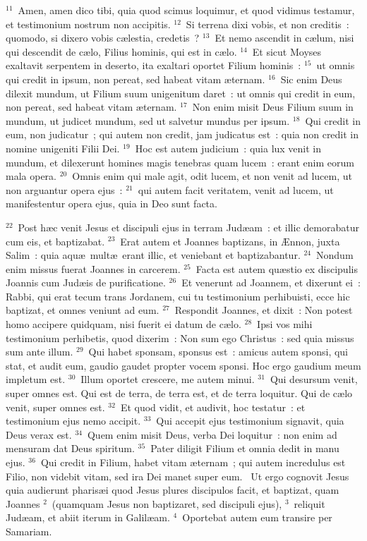 ${}^{11}$~Amen, amen dico tibi, quia quod scimus loquimur, et quod vidimus testamur, et testimonium nostrum non accipitis.
${}^{12}$~Si terrena dixi vobis, et non creditis~: quomodo, si dixero vobis c\ae lestia, credetis~?
${}^{13}$~Et nemo ascendit in c\ae lum, nisi qui descendit de c\ae lo, Filius hominis, qui est in c\ae lo.
${}^{14}$~Et sicut Moyses exaltavit serpentem in deserto, ita exaltari oportet Filium hominis~:
${}^{15}$~ut omnis qui credit in ipsum, non pereat, sed habeat vitam \ae ternam.
${}^{16}$~Sic enim Deus dilexit mundum, ut Filium suum unigenitum daret~: ut omnis qui credit in eum, non pereat, sed habeat vitam \ae ternam.
${}^{17}$~Non enim misit Deus Filium suum in mundum, ut judicet mundum, sed ut salvetur mundus per ipsum.
${}^{18}$~Qui credit in eum, non judicatur~; qui autem non credit, jam judicatus est~: quia non credit in nomine unigeniti Filii Dei.
${}^{19}$~Hoc est autem judicium~: quia lux venit in mundum, et dilexerunt homines magis tenebras quam lucem~: erant enim eorum mala opera.
${}^{20}$~Omnis enim qui male agit, odit lucem, et non venit ad lucem, ut non arguantur opera ejus~:
${}^{21}$~qui autem facit veritatem, venit ad lucem, ut manifestentur opera ejus, quia in Deo sunt facta.


${}^{22}$~Post h\ae c venit Jesus et discipuli ejus in terram Jud\ae am~: et illic demorabatur cum eis, et baptizabat.
${}^{23}$~Erat autem et Joannes baptizans, in \AE nnon, juxta Salim~: quia aqu\ae\ mult\ae\ erant illic, et veniebant et baptizabantur.
${}^{24}$~Nondum enim missus fuerat Joannes in carcerem.
${}^{25}$~Facta est autem qu\ae stio ex discipulis Joannis cum Jud\ae is de purificatione.
${}^{26}$~Et venerunt ad Joannem, et dixerunt ei~: Rabbi, qui erat tecum trans Jordanem, cui tu testimonium perhibuisti, ecce hic baptizat, et omnes veniunt ad eum.
${}^{27}$~Respondit Joannes, et dixit~: Non potest homo accipere quidquam, nisi fuerit ei datum de c\ae lo.
${}^{28}$~Ipsi vos mihi testimonium perhibetis, quod dixerim~: Non sum ego Christus~: sed quia missus sum ante illum.
${}^{29}$~Qui habet sponsam, sponsus est~: amicus autem sponsi, qui stat, et audit eum, gaudio gaudet propter vocem sponsi. Hoc ergo gaudium meum impletum est.
${}^{30}$~Illum oportet crescere, me autem minui.
${}^{31}$~Qui desursum venit, super omnes est. Qui est de terra, de terra est, et de terra loquitur. Qui de c\ae lo venit, super omnes est.
${}^{32}$~Et quod vidit, et audivit, hoc testatur~: et testimonium ejus nemo accipit.
${}^{33}$~Qui accepit ejus testimonium signavit, quia Deus verax est.
${}^{34}$~Quem enim misit Deus, verba Dei loquitur~: non enim ad mensuram dat Deus spiritum.
${}^{35}$~Pater diligit Filium et omnia dedit in manu ejus.
${}^{36}$~Qui credit in Filium, habet vitam \ae ternam~; qui autem incredulus est Filio, non videbit vitam, sed ira Dei manet super eum.
~\lettrine[lines=10,image=true,loversize=0.05,lraise=-0.03]{U}{}t ergo cognovit Jesus quia audierunt pharis\ae i quod Jesus plures discipulos facit, et baptizat, quam Joannes
${}^{2}$~(quamquam Jesus non baptizaret, sed discipuli ejus),
${}^{3}$~reliquit Jud\ae am, et abiit iterum in Galil\ae am.
${}^{4}$~Oportebat autem eum transire per Samariam.


